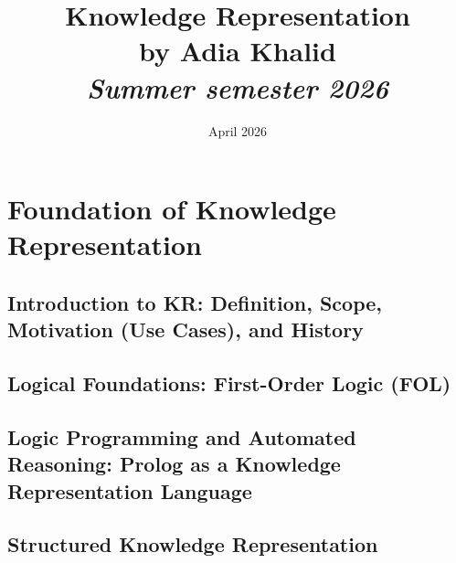 









\usepackage{biblatex}


\title{Knowledge Representation \\ \small{by Adia Khalid} \\ \textit{\footnotesize{Summer semester 2026} } }
\date{April 2026}



    \maketitle

    \tableofcontents


    \part{Foundation of Knowledge Representation}\label{part:foundation-of-knowledge-representation}


    \chapter{Introduction to KR: Definition, Scope, Motivation (Use Cases), and History}\label{ch:introduction}
    


    \chapter{Logical Foundations: First-Order Logic (FOL)}\label{ch:logical-foundations:-first-order-logic-(fol)}
    


    \chapter{Logic Programming and Automated Reasoning: Prolog as a Knowledge Representation Language}\label{ch:logic-programming-and-automated-reasoning}
    


    \chapter{Structured Knowledge Representation}\label{ch:structured-knowledge-representation}
    

